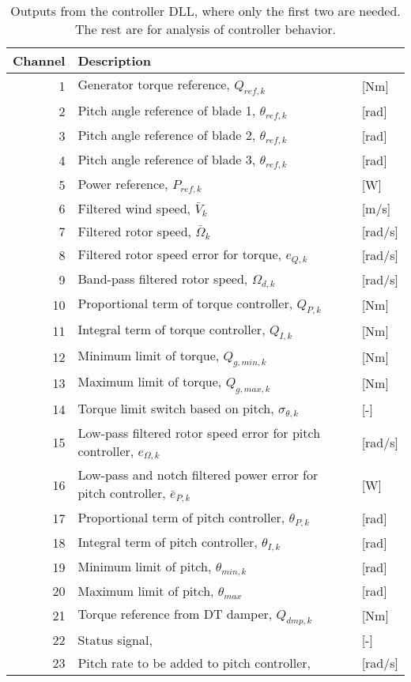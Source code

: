 \begin{table}[t]
\center
\begin{tabular}{r|ll}
Channel & Description \\ \hline
 1& Generator torque reference, $Q_{ref,k}$            &[Nm]\\
 2& Pitch angle reference of blade 1, $\theta_{ref,k}$      &[rad]\\
 3& Pitch angle reference of blade 2, $\theta_{ref,k}$      &[rad]\\
 4& Pitch angle reference of blade 3, $\theta_{ref,k}$      &[rad]\\
 5& Power reference, $P_{ref,k}$                       &[W]\\
 6& Filtered wind speed, $\bar V_k$                   &[m/s]\\
 7& Filtered rotor speed, $\bar \Omega_k$                  &[rad/s]\\
 8& Filtered rotor speed error for torque, $e_{Q,k}$ &[rad/s]\\
 9& Band-pass filtered rotor speed, $\Omega_{d,k}$         &[rad/s]\\
10& Proportional term of torque controller, $Q_{P,k}$    &[Nm]\\
11& Integral term of torque controller, $Q_{I,k}$    &[Nm]\\
12& Minimum limit of torque, $Q_{g,min,k}$               &[Nm]\\
13& Maximum limit of torque, $Q_{g,max,k}$               &[Nm]\\
14& Torque limit switch based on pitch, $\sigma_{\theta,k}$    &[-]\\
15& Low-pass filtered rotor speed error for pitch controller, $e_{\Omega,k}$  &[rad/s]\\
16& Low-pass and notch filtered power error for pitch controller, $\bar e_{P,k}$                 &[W]\\
17& Proportional term of pitch controller, $\theta_{P,k}$ &[rad]\\
18& Integral term of pitch controller, $\theta_{I,k}$     &[rad]\\
19& Minimum limit of pitch, $\theta_{min,k}$                &[rad]\\
20& Maximum limit of pitch, $\theta_{max}$                &[rad]\\
21& Torque reference from DT damper, $Q_{dmp,k}$       &[Nm] \\
22& Status signal,        &[-] \\
23& Pitch rate to be added to pitch controller,        &[rad/s]
\end{tabular}
\caption{Outputs from the controller DLL, where only the first two are needed. The rest are for analysis of controller behavior.  \label{t:output}}
\end{table}

